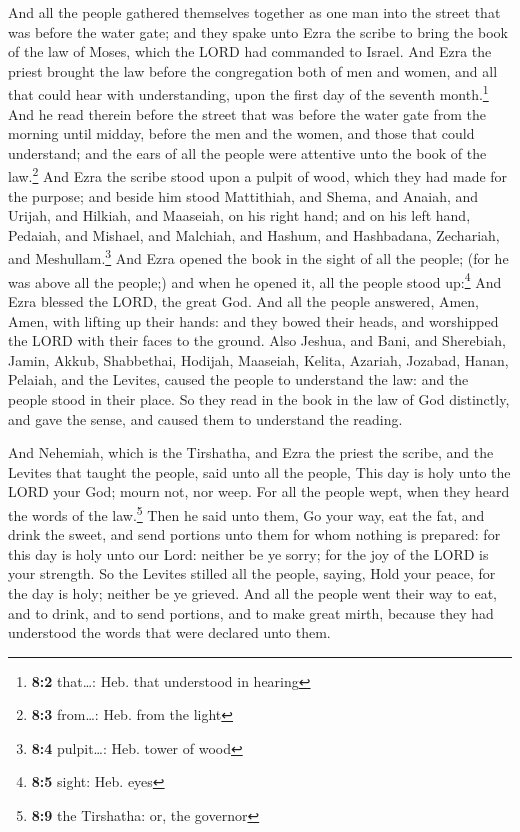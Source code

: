  And all the people gathered themselves together as one
man into the street that was before the water gate; and they spake unto
Ezra the scribe to bring the book of the law of Moses, which the LORD
had commanded to Israel.  And Ezra the priest brought the
law before the congregation both of men and women, and all that could
hear with understanding, upon the first day of the seventh
month.\footnote{\textbf{8:2} that\ldots: Heb. that understood in hearing}
 And he read therein before the street that was before the
water gate from the morning until midday, before the men and the women,
and those that could understand; and the ears of all the people were
attentive unto the book of the law.\footnote{\textbf{8:3} from\ldots:
  Heb. from the light}  And Ezra the scribe stood upon a
pulpit of wood, which they had made for the purpose; and beside him
stood Mattithiah, and Shema, and Anaiah, and Urijah, and Hilkiah, and
Maaseiah, on his right hand; and on his left hand, Pedaiah, and Mishael,
and Malchiah, and Hashum, and Hashbadana, Zechariah, and
Meshullam.\footnote{\textbf{8:4} pulpit\ldots: Heb. tower of wood}
 And Ezra opened the book in the sight of all the people;
(for he was above all the people;) and when he opened it, all the people
stood up:\footnote{\textbf{8:5} sight: Heb. eyes}  And
Ezra blessed the LORD, the great God. And all the people answered, Amen,
Amen, with lifting up their hands: and they bowed their heads, and
worshipped the LORD with their faces to the ground.  Also
Jeshua, and Bani, and Sherebiah, Jamin, Akkub, Shabbethai, Hodijah,
Maaseiah, Kelita, Azariah, Jozabad, Hanan, Pelaiah, and the Levites,
caused the people to understand the law: and the people stood in their
place.  So they read in the book in the law of God
distinctly, and gave the sense, and caused them to understand the
reading.

 And Nehemiah, which is the Tirshatha, and Ezra the priest
the scribe, and the Levites that taught the people, said unto all the
people, This day is holy unto the LORD your God; mourn not, nor weep.
For all the people wept, when they heard the words of the
law.\footnote{\textbf{8:9} the Tirshatha: or, the governor}
 Then he said unto them, Go your way, eat the fat, and
drink the sweet, and send portions unto them for whom nothing is
prepared: for this day is holy unto our Lord: neither be ye sorry; for
the joy of the LORD is your strength.  So the Levites
stilled all the people, saying, Hold your peace, for the day is holy;
neither be ye grieved.  And all the people went their way
to eat, and to drink, and to send portions, and to make great mirth,
because they had understood the words that were declared unto them.

